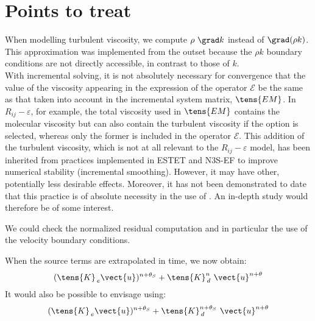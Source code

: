 \section*{Points to treat}\label{Base_Predvv_section4}
When modelling turbulent viscosity, we compute $\rho\ \grad k$ instead of $\grad(\rho k)$. This
approximation was implemented from the outset because the $\rho k$ boundary conditions are not directly accessible, in contrast to those of $k$.\\

With incremental solving, it is not absolutely necessary for convergence that the value of the viscosity appearing in the expression of the operator $\mathcal{E}$ be the same as that taken into account in the incremental system matrix, $\tens{EM}$. In $R_{ij}-\varepsilon$, for example, the total viscosity used in $\tens{EM}$ contains the molecular viscosity but can also contain the turbulent viscosity if the option  is selected, whereas only the former is included in the operator $\mathcal{E}$. This addition of the turbulent viscosity, which is not at all relevant to the $R_{ij}-\varepsilon$ model, has been inherited from practices implemented in
ESTET and N3S-EF to improve numerical stability (incremental smoothing). However, it may have other, potentially less desirable effects. Moreover, it has not been demonstrated to date that this practice is of absolute necessity in the use of \CS. An in-depth study would therefore be of some interest.


We could check the normalized residual computation and in particular the use of the velocity boundary conditions.

When the source terms are extrapolated in time, we now obtain:
\begin{equation}\notag
(\tens{K}_{\,e}\vect{u})^{n+\theta_S} + \tens{K}_{\,d}^{n}\ \vect{u}^{n+\theta}
\end{equation}
It would also be possible to envisage using:
\begin{equation}\notag
(\tens{K}_{\,e}\vect{u})^{n+\theta_S} + \tens{K}_{\,d}^{n+\theta_S}\ \vect{u}^{n+\theta}
\end{equation}
